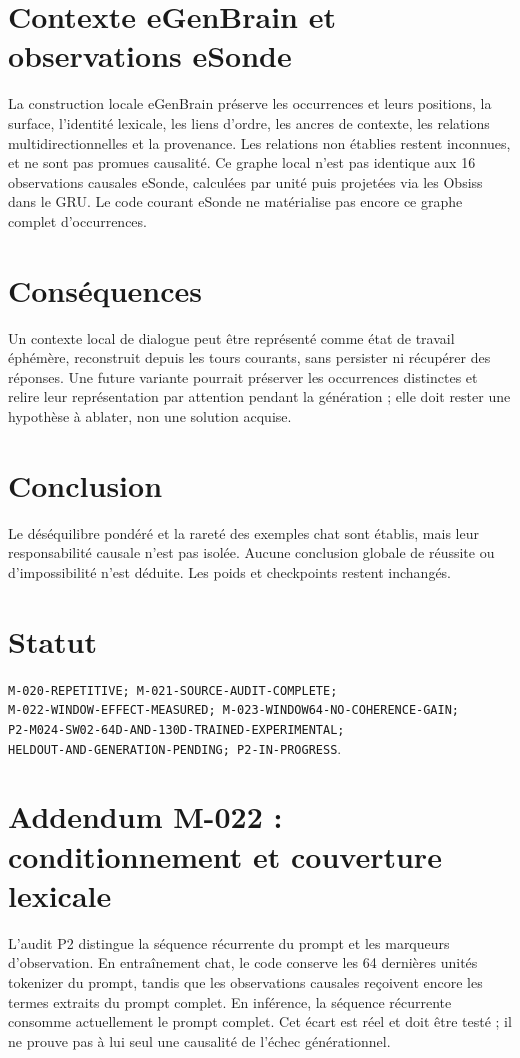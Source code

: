 \documentclass[11pt,a4paper]{report}
\begin{document}
\section{Contexte eGenBrain et observations eSonde}
La construction locale eGenBrain préserve les occurrences et leurs positions, la surface, l'identité lexicale, les liens d'ordre, les ancres de contexte, les relations multidirectionnelles et la provenance. Les relations non établies restent inconnues, et ne sont pas promues causalité. Ce graphe local n'est pas identique aux 16 observations causales eSonde, calculées par unité puis projetées via les Obsiss dans le GRU. Le code courant eSonde ne matérialise pas encore ce graphe complet d'occurrences.
\section{Conséquences}
Un contexte local de dialogue peut être représenté comme état de travail éphémère, reconstruit depuis les tours courants, sans persister ni récupérer des réponses. Une future variante pourrait préserver les occurrences distinctes et relire leur représentation par attention pendant la génération ; elle doit rester une hypothèse à ablater, non une solution acquise.
\section{Conclusion}
Le déséquilibre pondéré et la rareté des exemples chat sont établis, mais leur responsabilité causale n'est pas isolée. Aucune conclusion globale de réussite ou d'impossibilité n'est déduite. Les poids et checkpoints restent inchangés.
\section{Statut}
\begin{sloppypar}
\texttt{M-020-REPETITIVE; M-021-SOURCE-AUDIT-COMPLETE;}\\
\texttt{M-022-WINDOW-EFFECT-MEASURED; M-023-WINDOW64-NO-COHERENCE-GAIN;}\\
\texttt{P2-M024-SW02-64D-AND-130D-TRAINED-EXPERIMENTAL;}\\
\texttt{HELDOUT-AND-GENERATION-PENDING; P2-IN-PROGRESS}.
\end{sloppypar}



\section*{Addendum M-022 : conditionnement et couverture lexicale}
L'audit P2 distingue la séquence récurrente du prompt et les marqueurs d'observation. En entraînement chat, le code conserve les 64 dernières unités tokenizer du prompt, tandis que les observations causales reçoivent encore les termes extraits du prompt complet. En inférence, la séquence récurrente consomme actuellement le prompt complet. Cet écart est réel et doit être testé ; il ne prouve pas à lui seul une causalité de l'échec générationnel.
\end{document}
